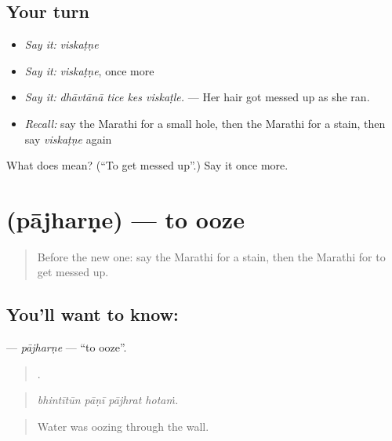 \subsection*{Your turn}
\begin{itemize}
\raggedright
  \item \emph{Say it:} \emph{viskaṭṇe}
  \item \emph{Say it:} \emph{viskaṭṇe}, once more
  \item \emph{Say it:} \emph{dhāvtānā tice kes viskaṭle.} — Her hair got messed up as she ran.
  \item \emph{Recall:} say the Marathi for a small hole, then the Marathi for a stain, then say \emph{viskaṭṇe} again
\end{itemize}

\begin{tcolorbox}[breakable,colback=teal!4,colframe=teal!35!black,title={Before you move on}]
What does  mean? (\textquotedblleft{}To get messed up\textquotedblright{}.) Say it once more.
\end{tcolorbox}
\section[\texorpdfstring{\mr{पाझरणे} (pājharṇe)}{पाझरणे (pājharṇe)}]{ (pājharṇe) — to ooze}

\label{lesson:MR-C432-pajharne}



\begin{quote}
Before the new one: say the Marathi for a stain, then the Marathi for to get messed up.
\end{quote}

\subsection*{You'll want to know: }
\textbf{} — \emph{pājharṇe} — \textquotedblleft{}to ooze\textquotedblright{}.

\begin{quote}
   .
\end{quote}

\begin{quote}
\emph{bhintītūn pāṇī pājhrat hotaṁ.}
\end{quote}

\begin{quote}
Water was oozing through the wall.
\end{quote}

